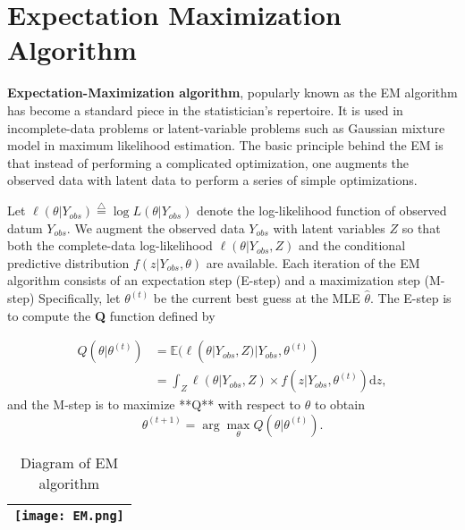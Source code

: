 \documentclass[titlestyle=hang,11pt]{elegantbook}
\begin{document}
\section{ Expectation Maximization Algorithm}

\textbf{Expectation-Maximization algorithm}, popularly known as the  EM algorithm has become a standard piece in the statistician's repertoire.
It is used in incomplete-data problems or latent-variable problems such as Gaussian mixture model in maximum likelihood  estimation.
The basic principle behind the EM is that instead of performing a complicated optimization,
one augments the observed data with latent data to perform a series of simple optimizations.

Let $\ell(\theta|Y_{obs})\stackrel{\triangle}=\log{L(\theta|Y_{obs})}$ denote the log-likelihood function of observed datum $Y_{obs}$.
We augment the observed data $Y_{obs}$ with latent variables $Z$ so that both the
complete-data log-likelihood $\ell(\theta|Y_{obs}, Z)$ and the conditional predictive distribution $f(z|Y_{obs}, \theta)$ are available.
Each iteration of the EM algorithm consists of an expectation step (E-step) and a maximization step (M-step)
Specifically, let $\theta^{(t)}$ be the current best guess at the MLE $\hat\theta$. The E-step
is to compute the \textbf{Q} function defined by

\begin{align}
Q(\theta|\theta^{(t)})
&= \mathbb{E}(\ell(\theta|Y_{obs}, Z)|Y_{obs},\theta^{(t)}) \\
&= \int_{Z}\ell(\theta|Y_{obs}, Z)\times f(z|Y_{obs}, \theta^{(t)})\mathrm{d}z,
\end{align}
and the M-step is to maximize **Q** with respect to $\theta$ to obtain
$$\theta^{(t+1)}=\arg\max_{\theta} Q(\theta|\theta^{(t)}).$$


\begin{table}[h]
	\centering
	\caption{Diagram of EM algorithm}
	\begin{tabular}{|c|}
		\hline
		\texttt{[image: EM.png]}  \\
		\hline
	\end{tabular}
\end{table}
\end{document}
